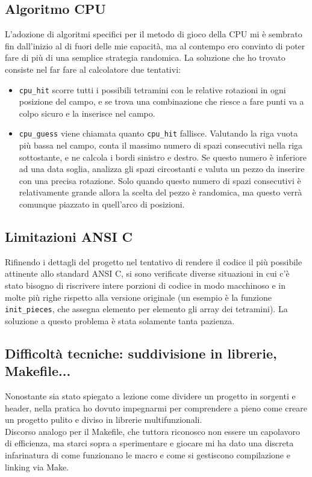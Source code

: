 \documentclass[a4paper]{article}
\begin{document}
\subsection{Algoritmo CPU}
L'adozione di algoritmi specifici per il metodo di gioco della CPU mi è sembrato fin dall'inizio al di fuori delle mie capacità, ma al contempo ero convinto di poter fare di più di una semplice strategia randomica. La soluzione che ho trovato consiste nel far fare al calcolatore due tentativi:
\begin{itemize}
	\item \texttt{cpu_hit} scorre tutti i possibili tetramini con le relative rotazioni in ogni posizione del campo, e se trova una combinazione che riesce a fare punti va a colpo sicuro e la inserisce nel campo.
	\item \texttt{cpu_guess} viene chiamata quanto \texttt{cpu_hit} fallisce. Valutando la riga vuota più bassa nel campo, conta il massimo numero di spazi consecutivi nella riga sottostante, e ne calcola i bordi sinistro e destro. Se questo numero è inferiore ad una data soglia, analizza gli spazi circostanti e valuta un pezzo da inserire con una precisa rotazione. Solo quando questo numero di spazi consecutivi è relativamente grande allora la scelta del pezzo è randomica, ma questo verrà comunque piazzato in quell'arco di posizioni.
\end{itemize}

\newpage

\subsection{Limitazioni ANSI C}
Rifinendo i dettagli del progetto nel tentativo di rendere il codice il più possibile attinente allo standard ANSI C, si sono verificate diverse situazioni in cui c'è stato bisogno di riscrivere intere porzioni di codice in modo macchinoso e in molte più righe rispetto alla versione originale (un esempio è la funzione \texttt{init_pieces}, che assegna elemento per elemento gli array dei tetramini). La soluzione a questo problema è stata solamente tanta pazienza.

\subsection{Difficoltà tecniche: suddivisione in librerie, Makefile...}
Nonostante sia stato spiegato a lezione come dividere un progetto in sorgenti e header, nella pratica ho dovuto impegnarmi per comprendere a pieno come creare un progetto pulito e diviso in librerie multifunzionali.\\
Discorso analogo per il Makefile, che tuttora riconosco non essere un capolavoro di efficienza, ma starci sopra a sperimentare e giocare mi ha dato una discreta infarinatura di come funzionano le macro e come si gestiscono compilazione e linking via Make.
\end{document}
